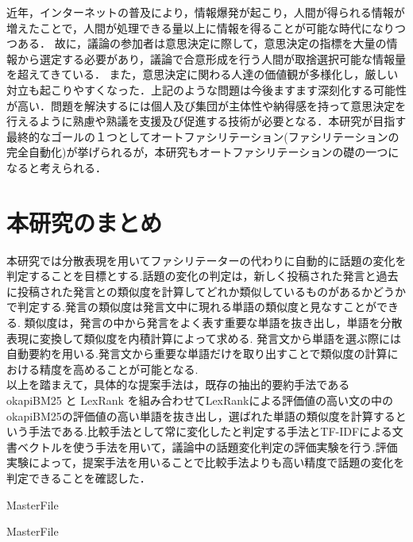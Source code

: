 近年，インターネットの普及により，情報爆発が起こり，人間が得られる情報が増えたことで，人間が処理できる量以上に情報を得ることが可能な時代になりつつある．
故に，議論の参加者は意思決定に際して，意思決定の指標を大量の情報から選定する必要があり，議論で合意形成を行う人間が取捨選択可能な情報量を超えてきている．
また，意思決定に関わる人達の価値観が多様化し，厳しい対立も起こりやすくなった．上記のような問題は今後ますます深刻化する可能性が高い．問題を解決するには個人及び集団が主体性や納得感を持って意思決定を行えるように熟慮や熟議を支援及び促進する技術が必要となる．本研究が目指す最終的なゴールの１つとしてオートファシリテーション(ファシリテーションの完全自動化)が挙げられるが，本研究もオートファシリテーションの礎の一つになると考えられる．

\section{本研究のまとめ}
\label{con:conclusion}
本研究では分散表現を用いてファシリテーターの代わりに自動的に話題の変化を判定することを目標とする.話題の変化の判定は，新しく投稿された発言と過去に投稿された発言との類似度を計算してどれか類似しているものがあるかどうかで判定する.発言の類似度は発言文中に現れる単語の類似度と見なすことができる.
類似度は，発言の中から発言をよく表す重要な単語を抜き出し，単語を分散表現に変換して類似度を内積計算によって求める.
 発言文から単語を選ぶ際には自動要約を用いる.発言文から重要な単語だけを取り出すことで類似度の計算における精度を高めることが可能となる.\\
以上を踏まえて，具体的な提案手法は，既存の抽出的要約手法である okapiBM25 と LexRank を組み合わせてLexRankによる評価値の高い文の中のokapiBM25の評価値の高い単語を抜き出し，選ばれた単語の類似度を計算するという手法である.比較手法として常に変化したと判定する手法とTF-IDFによる文書ベクトルを使う手法を用いて，議論中の話題変化判定の評価実験を行う.評価実験によって，提案手法を用いることで比較手法よりも高い精度で話題の変化を判定できることを確認した．

 \expandafter\ifx\csname MasterFile\endcsname\relax
	\def\BibFile{hoge}
	
  \fi
  \expandafter\ifx\csname MasterFile\endcsname\relax

\fi
